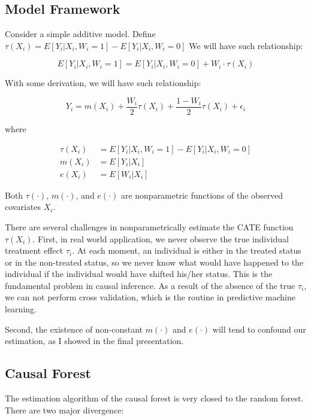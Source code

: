 \documentclass[]{article}
\begin{document}
\subsection{Model Framework}\label{model-framework}

Consider a simple additive model. Define
\(\tau(X_{i})=E[Y_{i} | X_{i}, W_{i}=1] - E[Y_{i} | X_{i}, W_{i}=0]\) We
will have such relationship:

\[ E[Y_{i} | X_{i}, W_{i}=1] =  E[Y_{i} | X_{i}, W_{i}=0]+W_{i}\cdot \tau(X_{i})\]

With some derivation, we will have such relationship:

\[Y_{i}=m(X_{i})+\frac{W_{i}}{2}\tau(X_{i})+\frac{1-W_{i}}{2}\tau(X_{i})+\epsilon_{i}\]

where

\[
\begin{aligned}
\tau(X_{i})&=E[Y_{i} | X_{i}, W_{i}=1] - E[Y_{i} | X_{i}, W_{i}=0] \\
m(X_{i})&=E[Y_{i} | X_{i}] \\
e(X_{i})&=E[W_{i} | X_{i}]
\end{aligned}
\]

Both \(\tau(\cdot)\), \(m(\cdot)\), and \(e(\cdot)\) are nonparametric
functions of the observed covariates \(X_{i}\).

There are several challenges in nonparametrically estimate the CATE
function \(\tau(X_{i})\). First, in real world application, we never
observe the true individual treatment effect \(\tau_{i}\). At each
moment, an individual is either in the treated status or in the
non-treated status, so we never know what would have happened to the
individual if the individual would have shifted his/her status. This is
the fundamental problem in causal inference. As a result of the absence
of the true \(\tau_{i}\), we can not perform cross validation, which is
the routine in predictive machine learning.

Second, the existence of non-constant \(m(\cdot)\) and \(e(\cdot)\) will
tend to confound our estimation, as I showed in the final presentation.

\subsection{Causal Forest}\label{causal-forest}

The estimation algorithm of the causal forest is very closed to the
random forest. There are two major divergence:
\end{document}
